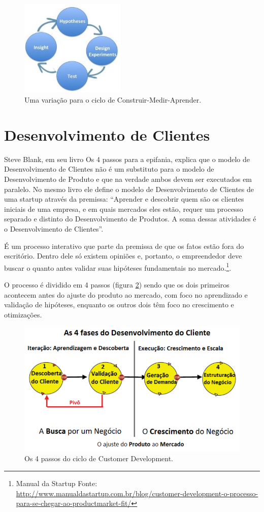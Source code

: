 \begin{figure}[htb]
\centering
\includegraphics[width=5cm]{figuras/hypotheses-experiment}
\caption{\label{fig:hypotheses-experiment} Uma variação para o ciclo de Construir-Medir-Aprender.}
\end{figure}

\section{Desenvolvimento de Clientes}
\par Steve Blank, em seu livro Os 4 passos para a epifania, explica que o modelo de Desenvolvimento de Clientes não é um substituto para o modelo de Desenvolvimento de Produto e que na verdade ambos devem ser executados em paralelo. No mesmo livro ele define o modelo de Desenvolvimento de Clientes de uma startup através da premissa: “Aprender e descobrir quem são os clientes iniciais de uma empresa, e em quais mercados eles estão, requer um processo separado e distinto do Desenvolvimento de Produtos. A soma dessas atividades é o Desenvolvimento de Clientes”. \citep{blank:03} 
\par É um processo interativo que parte da premissa de que os fatos estão fora do escritório. Dentro dele só existem opiniões e, portanto, o empreendedor deve buscar o quanto antes validar suas hipóteses fundamentais no mercado.\footnote{Manual da Startup Fonte: \url{http://www.manualdastartup.com.br/blog/customer-development-o-processo-para-se-chegar-ao-productmarket-fit/}}.
\par O processo é dividido em 4 passos (figura \ref{fig:customerdevelopment}) sendo que os dois primeiros acontecem antes do ajuste do produto ao mercado, com foco no aprendizado e validação de hipóteses, enquanto os outros dois têm foco no crescimento e otimizações.
\begin{figure}[htb]
\centering
\includegraphics[width=15cm]{figuras/customerdevelopment}
\caption{\label{fig:customerdevelopment}Os 4 passos do ciclo de Customer Development.}
\end{figure}
